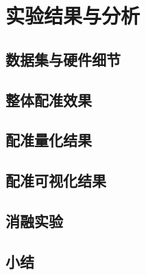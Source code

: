 \chapter{实验结果与分析}

\section{数据集与硬件细节}
\section{整体配准效果}
\section{配准量化结果}
\section{配准可视化结果}
\section{消融实验}
\section{小结}